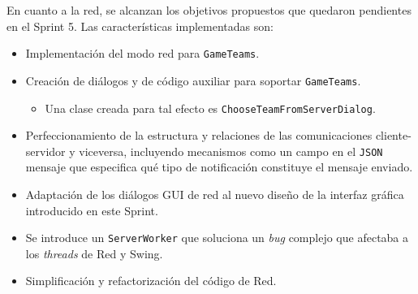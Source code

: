 \documentclass[../DocumentoOficial.tex]{subfiles}
\begin{document}
\begin{sprint}[6]
En cuanto a la red, se alcanzan los objetivos propuestos que quedaron pendientes en el Sprint 5. Las características implementadas son:

\begin{itemize}
\item Implementación del modo red para \texttt{GameTeams}.

\item Creación de diálogos y de código auxiliar para soportar \texttt{GameTeams}.

\begin{itemize}
\item Una clase creada para tal efecto es \texttt{ChooseTeamFromServerDialog}.
\end{itemize}


\item Perfeccionamiento de la estructura y relaciones de las comunicaciones cliente-servidor y viceversa, incluyendo mecanismos como un campo en el \texttt{JSON} mensaje que especifica qué tipo de notificación constituye el mensaje enviado.

\item Adaptación de los diálogos GUI de red al nuevo diseño de la interfaz gráfica introducido en este Sprint.

\item Se introduce un \texttt{ServerWorker} que soluciona un \textit{bug} complejo que afectaba a los \textit{threads} de Red y Swing.

\item Simplificación y refactorización del código de Red.
\end{itemize}

\newpage


\end{sprint}
\end{document}
